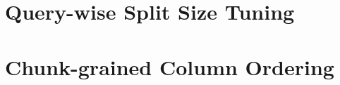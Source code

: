\section{Query-wise Split Size Tuning}
\label{sec:split-size}

\section{Chunk-grained Column Ordering}
\label{sec:chunk-ordering}